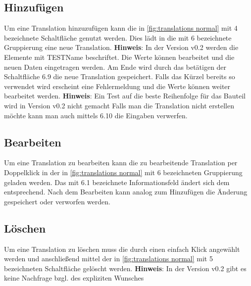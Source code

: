 \documentclass{book}
\newcommand{\hinweis}[1]{\newline \textbf{Hinweis}: #1 \newline}
\begin{document}
			\subsection{Hinzufügen} \label{translation-hinzufuegen}
				Um eine Translation hinzuzufügen kann die in \hyperref[fig:translations normal]{\ref{fig:translations normal}} mit 4 bezeichnete Schaltfläche genutzt werden. Dies lädt in die mit 6 bezeichnete Gruppierung eine neue Translation.
				\hinweis{In der Version v0.2 werden die Elemente mit \glqq TESTName\grqq\xspace beschriftet.}
				Die Werte können bearbeitet und die neuen Daten eingetragen werden. Am Ende wird durch das betätigen der Schaltfläche 6.9 die neue Translation gespeichert. Falls das Kürzel bereits so verwendet wird erscheint eine Fehlermeldung und die Werte können weiter bearbeitet werden.
				\hinweis{Ein Test auf die beste Reihenfolge für das Bauteil wird in Version v0.2 nicht gemacht}
				Falls man die Translation nicht erstellen möchte kann man auch mittels 6.10 die Eingaben verwerfen.
				
			\subsection{Bearbeiten} \label{translation-bearbeiten}
				Um eine Translation zu bearbeiten kann die zu bearbeitende Translation per Doppelklick in der in \hyperref[fig:translations normal]{\ref{fig:translations normal}} mit 6 bezeichneten Gruppierung geladen werden. Das mit 6.1 bezeichnete Informationsfeld ändert sich dem entsprechend. Nach dem Bearbeiten kann analog zum Hinzufügen die Änderung gespeichert oder verworfen werden.
			\subsection{Löschen} \label{translation-loeschen}
				Um eine Translation zu löschen muss die durch einen einfach Klick angewählt werden und anschließend mittel der in \hyperref[fig:translations normal]{\ref{fig:translations normal}} mit 5 bezeichneten Schaltfläche gelöscht werden.
				\hinweis{In der Version v0.2 gibt es keine Nachfrage bzgl. des expliziten Wunsches}			
\end{document}
